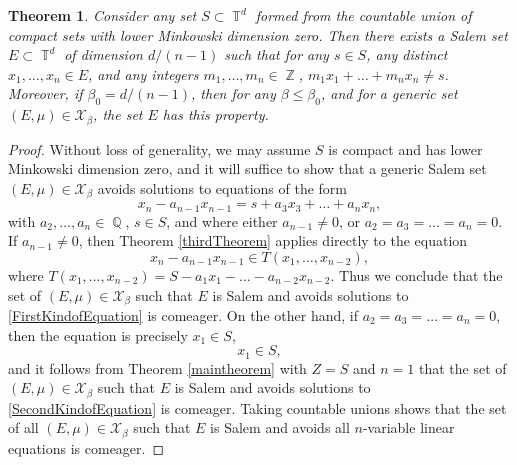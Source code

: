 \documentclass[dvipsnames,letterpaper,12pt]{article}
\numberwithin{equation}{section}
\DeclareMathOperator{\ZZ}{\mathbb{Z}}
\DeclareMathOperator{\QQ}{\mathbb{Q}}
\DeclareMathOperator{\TT}{\mathbb{T}}
\newtheorem{theorem}{Theorem}
\numberwithin{theorem}{section}
\begin{document}
\begin{theorem} \label{dDimensionalKornerResult}
    Consider any set $S \subset \TT^d$ formed from the countable union of compact sets with lower Minkowski dimension zero. Then there exists a Salem set $E \subset \TT^d$ of dimension $d/(n-1)$ such that for any $s \in S$, any distinct $x_1,\dots,x_n \in E$, and any integers $m_1,\dots,m_n \in \ZZ$, $m_1x_1 + \dots + m_nx_n \neq s$. Moreover, if $\beta_0 = d/(n-1)$, then for any $\beta \leq \beta_0$, and for a generic set $(E,\mu) \in \mathcal{X}_\beta$, the set $E$ has this property.
\end{theorem}
\begin{proof}
    Without loss of generality, we may assume $S$ is compact and has lower Minkowski dimension zero, and it will suffice to show that a generic Salem set $(E,\mu) \in \mathcal{X}_\beta$ avoids solutions to equations of the form
    \begin{equation}
        x_n - a_{n-1} x_{n-1} = s + a_3x_3 + \dots + a_nx_n,
    \end{equation}
    with $a_2,\dots,a_n \in \QQ$, $s \in S$, and where either $a_{n-1} \neq 0$, or $a_2 = a_3 = \dots = a_n = 0$. If $a_{n-1} \neq 0$, then Theorem \ref{thirdTheorem} applies directly to the equation
    \begin{equation} \label{FirstKindofEquation}
        x_n - a_{n-1} x_{n-1} \in T(x_1,\dots,x_{n-2}),
    \end{equation}
    where $T(x_1,\dots,x_{n-2}) = S - a_1x_1 - \dots - a_{n-2}x_{n-2}$. Thus we conclude that the set of $(E,\mu) \in \mathcal{X}_\beta$ such that $E$ is Salem and avoids solutions to \eqref{FirstKindofEquation} is comeager. On the other hand, if $a_2 = a_3 = \dots = a_n = 0$, then the equation is precisely $x_1 \in S$,
    \begin{equation} \label{SecondKindofEquation}
        x_1 \in S,
    \end{equation}
    and it follows from Theorem \ref{maintheorem} with $Z = S$ and $n = 1$ that the set of $(E,\mu) \in \mathcal{X}_\beta$ such that $E$ is Salem and avoids solutions to \eqref{SecondKindofEquation} is comeager. Taking countable unions shows that the set of all $(E,\mu) \in \mathcal{X}_\beta$ such that $E$ is Salem and avoids all $n$-variable linear equations is comeager.
\end{proof}
\end{document}
